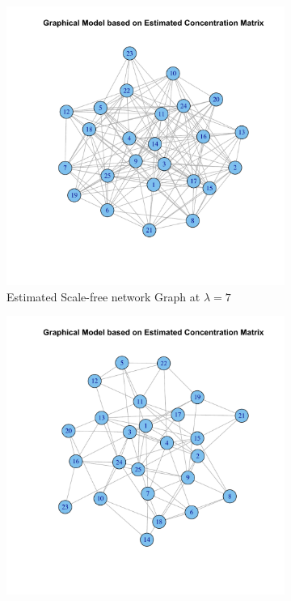 \documentclass[12pt, leqno]{article}
\begin{document}
\begin{figure}
\centering 
\begin{subfigure}[b]{0.40\textwidth}
  \includegraphics[width=\textwidth]{barabasigraphestimate7.pdf}
  \caption{Estimated Scale-free network Graph at $\lambda = 7$}
\label{fig:nearestgaphsestimate}
\end{subfigure}
\begin{subfigure}[b]{0.40\textwidth}
  \includegraphics[width=\textwidth]{barabasigraphestimate15.pdf}

\end{subfigure}
\end{figure}
\end{document}
